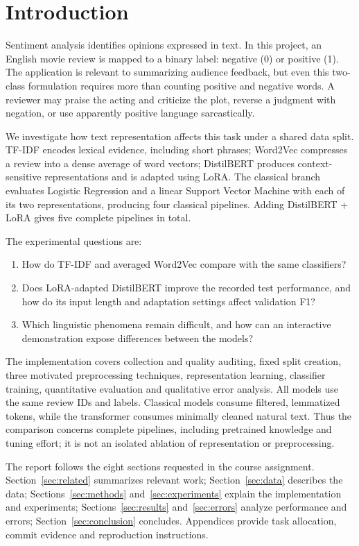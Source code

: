 \section{Introduction}\label{sec:introduction}
Sentiment analysis identifies opinions expressed in text. In this project, an
English movie review is mapped to a binary label: negative (0) or positive (1).
The application is relevant to summarizing audience feedback, but even this
two-class formulation requires more than counting positive and negative words.
A reviewer may praise the acting and criticize the plot, reverse a judgment with
negation, or use apparently positive language sarcastically.

We investigate how text representation affects this task under a shared data
split. TF-IDF encodes lexical evidence, including short phrases; Word2Vec
compresses a review into a dense average of word vectors; DistilBERT produces
context-sensitive representations and is adapted using LoRA. The classical
branch evaluates Logistic Regression and a linear Support Vector Machine with
each of its two representations, producing four classical pipelines. Adding
DistilBERT + LoRA gives five complete pipelines in total.

The experimental questions are:
\begin{enumerate}
  \item How do TF-IDF and averaged Word2Vec compare with the same classifiers?
  \item Does LoRA-adapted DistilBERT improve the recorded test performance, and
        how do its input length and adaptation settings affect validation F1?
  \item Which linguistic phenomena remain difficult, and how can an interactive
        demonstration expose differences between the models?
\end{enumerate}

The implementation covers collection and quality auditing, fixed split creation,
three motivated preprocessing techniques, representation learning, classifier
training, quantitative evaluation and qualitative error analysis. All models use
the same review IDs and labels. Classical models consume filtered, lemmatized
tokens, while the transformer consumes minimally cleaned natural text. Thus the
comparison concerns complete pipelines, including pretrained knowledge and tuning
effort; it is not an isolated ablation of representation or preprocessing.

The report follows the eight sections requested in the course assignment.
Section~\ref{sec:related} summarizes relevant work;
Section~\ref{sec:data} describes the data; Sections~\ref{sec:methods}
and~\ref{sec:experiments} explain the implementation and experiments;
Sections~\ref{sec:results} and~\ref{sec:errors} analyze performance and errors;
Section~\ref{sec:conclusion} concludes. Appendices provide task allocation,
commit evidence and reproduction instructions.
